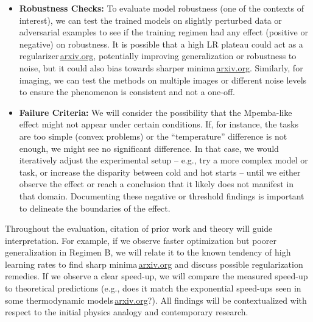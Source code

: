 \documentclass[11pt]{article}
\begin{document}
\begin{itemize}
\begin{itemize}
      \item In the imaging experiment, we can visually inspect intermediate outputs. Does the hot-start method initially produce a very grainy or distorted intermediate (due to the extra noise or large step), which then rapidly clarifies? Such a pattern would qualitatively support the hypothesis. We will also examine if any artifacts remain in the final output of the hot-start method.
    \end{itemize}
  \item \textbf{Robustness Checks:} To evaluate model robustness (one of the contexts of interest), we can test the trained models on slightly perturbed data or adversarial examples to see if the training regimen had any effect (positive or negative) on robustness. It is possible that a high LR plateau could act as a regularizer\,\href{https://arxiv.org/abs/1708.07120#:~:text=large maximum learning rate,simplification of the Hessian Free}{arxiv.org}, potentially improving generalization or robustness to noise, but it could also bias towards sharper minima\,\href{https://arxiv.org/html/2507.04206v1#:~:text=Generalization vs,bias training toward sharper minima}{arxiv.org}. Similarly, for imaging, we can test the methods on multiple images or different noise levels to ensure the phenomenon is consistent and not a one-off.
  \item \textbf{Failure Criteria:} We will consider the possibility that the Mpemba-like effect might not appear under certain conditions. If, for instance, the tasks are too simple (convex problems) or the ``temperature'' difference is not enough, we might see no significant difference. In that case, we would iteratively adjust the experimental setup -- e.g., try a more complex model or task, or increase the disparity between cold and hot starts -- until we either observe the effect or reach a conclusion that it likely does not manifest in that domain. Documenting these negative or threshold findings is important to delineate the boundaries of the effect.
\end{itemize}

Throughout the evaluation, citation of prior work and theory will guide interpretation. For example, if we observe faster optimization but poorer generalization in Regimen B, we will relate it to the known tendency of high learning rates to find sharp minima\,\href{https://arxiv.org/html/2507.04206v1#:~:text=Generalization vs,bias training toward sharper minima}{arxiv.org} and discuss possible regularization remedies. If we observe a clear speed-up, we will compare the measured speed-up to theoretical predictions (e.g., does it match the exponential speed-ups seen in some thermodynamic models\,\href{https://arxiv.org/html/2507.04206v1#:~:text=In this paper%2C using tools,that mirrors the WSD scheduler}{arxiv.org}?). All findings will be contextualized with respect to the initial physics analogy and contemporary research.
\end{document}
